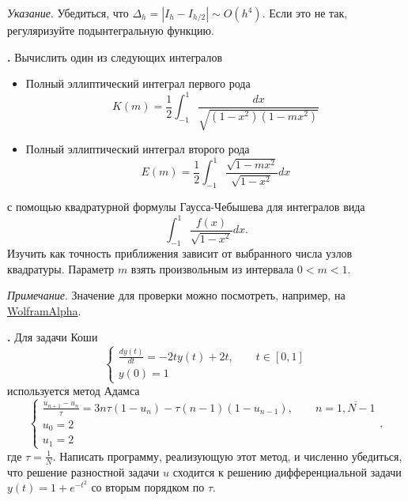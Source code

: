 \documentclass[12pt]{article}
\newcounter{task}
\newcommand{\problem}{\par\textbf{\stepcounter{task}\thetask. }}
\begin{document}
\emph{Указание}. Убедиться, что $\Delta_h = |I_h - I_{h/2}| \sim O(h^4)$. Если это
не так, регуляризуйте подынтегральную функцию.

\problem Вычислить один из следующих интегралов
\begin{itemize}
\item Полный эллиптический интеграл первого рода
\[
K(m) = \frac{1}{2}\int_{-1}^1 \frac{dx}{\sqrt{(1-x^2)(1 - m x^2)}}
\]
\item Полный эллиптический интеграл второго рода
\[
E(m) = \frac{1}{2}\int_{-1}^1 \frac{\sqrt{1 - m x^2}}{\sqrt{1-x^2}}dx
\]
\end{itemize}
с помощью квадратурной формулы Гаусса-Чебышева для интегралов вида
\[
\int_{-1}^1 \frac{f(x)}{\sqrt{1-x^2}} dx.
\]
Изучить как точность приближения зависит от выбранного числа узлов квадратуры.
Параметр $m$ взять произвольным из интервала $0 < m < 1$. 

\emph{Примечание}. Значение для проверки можно посмотреть, например, на \href{http://www.wolframalpha.com/input/?i=K(1\%2F2)}{WolframAlpha}.

\problem Для задачи Коши
\[
\begin{cases}
\displaystyle\frac{dy(t)}{dt} = -2t y(t) + 2 t, \qquad t \in [0,1]\\
y(0) = 1
\end{cases}
\]
используется метод Адамса
\[
\begin{cases}
\displaystyle\frac{u_{n+1} - u_{n}}{\tau} = 3 n \tau(1 - u_n) - \tau  (n-1)(1 - u_{n-1}), \qquad n =
\overline{1, N-1}\\
u_0 = 2\\
u_1 = 2
\end{cases},
\]
где $\tau = \frac{1}{N}$.
Написать программу, реализующую этот метод, и численно убедиться, что решение
разностной задачи $u$ сходится к решению дифференциальной задачи $y(t) = 1 + e^{-t^2}$ со вторым порядком
по $\tau$.
\end{document}
